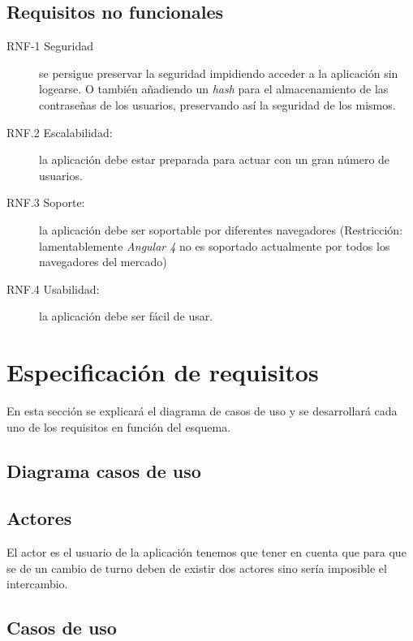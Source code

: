 \subsection{Requisitos no funcionales}\label{rnofuncionales}
\begin{description}
    \item [RNF-1 Seguridad] se persigue preservar la seguridad impidiendo acceder a la aplicación sin logearse. O también añadiendo un \emph{hash} para el almacenamiento de las contraseñas de los usuarios, preservando así la seguridad de los mismos.
    \item [RNF.2 Escalabilidad:] la aplicación debe estar preparada para actuar con un gran número de usuarios.
    \item [RNF.3 Soporte:]  la aplicación debe ser soportable por diferentes navegadores (Restricción: lamentablemente \emph{Angular 4} no es soportado actualmente por todos los navegadores del mercado)
    \item [RNF.4 Usabilidad:]  la aplicación debe ser fácil de usar.
\end{description}


\section{Especificación de requisitos}\label{requisitos}

En esta sección se explicará el diagrama de casos de uso y se desarrollará cada uno de los requisitos en función del esquema.

\subsection{Diagrama casos de uso}


\subsection{Actores}
El actor es el usuario de la aplicación tenemos que tener en cuenta que para que se de un cambio de turno deben de existir dos actores sino sería imposible el intercambio.

\subsection{Casos de uso}

